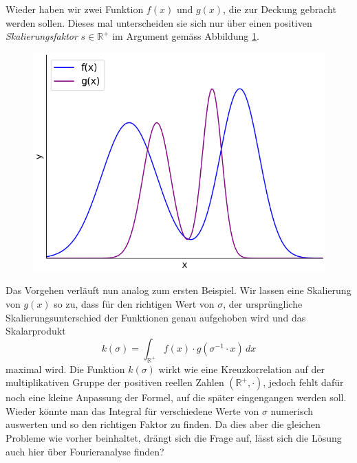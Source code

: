 Wieder haben wir zwei Funktion $f(x)$ und $g(x)$, die zur Deckung gebracht werden sollen. Dieses mal unterscheiden sie sich nur 
über einen positiven \emph{Skalierungsfaktor} $s \in \mathbb{R^+}$ im Argument gemäss Abbildung \ref{fig:mellin:f2}.
\begin{figure}
    \centering
    \includegraphics[width=.5\textwidth]{papers/mellin/images/f2}
    \caption{}
    \label{fig:mellin:f2}
\end{figure}
Das Vorgehen verläuft nun analog zum ersten Beispiel. Wir lassen eine Skalierung von $g(x)$ so zu, dass für den richtigen Wert von
$\sigma$, der ursprüngliche Skalierungsunterschied der Funktionen genau aufgehoben wird und das Skalarprodukt
\begin{equation}
    k(\sigma) = \int_\mathbb{R^+} f(x) \cdot g(\sigma^{-1} \cdot x)\,dx
    \label{mellin:ksigma}
\end{equation}
maximal wird.
Die Funktion $k(\sigma)$ wirkt wie eine Kreuzkorrelation auf der multiplikativen Gruppe der positiven reellen Zahlen 
$(\mathbb{R^+},\cdot)$, jedoch fehlt dafür noch eine kleine Anpassung der Formel, auf die später eingengangen werden soll. 
Wieder könnte man das Integral für verschiedene Werte von $\sigma$ numerisch auswerten und so den richtigen Faktor zu finden. 
Da dies aber die gleichen Probleme wie vorher beinhaltet, drängt sich die Frage auf, lässt sich die Lösung auch hier über 
Fourieranalyse finden?



